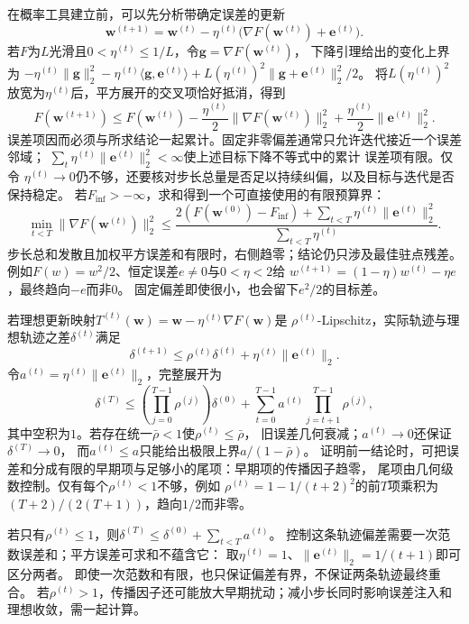在概率工具建立前，可以先分析带确定误差的更新
\[
  \bm{w}^{(t+1)}
  =\bm{w}^{(t)}-\eta^{(t)}
  \bigl(\nabla F(\bm{w}^{(t)})+\bm{e}^{(t)}\bigr).
\]
若$F$为$L$光滑且$0<\eta^{(t)}\leq1/L$，令$\bm g=\nabla F(\bm w^{(t)})$，
下降引理给出的变化上界为
$-\eta^{(t)}\|\bm g\|_2^2-\eta^{(t)}\langle\bm g,\bm e^{(t)}\rangle
+L(\eta^{(t)})^2\|\bm g+\bm e^{(t)}\|_2^2/2$。
将$L(\eta^{(t)})^2$放宽为$\eta^{(t)}$后，平方展开的交叉项恰好抵消，得到
\[
  F(\bm{w}^{(t+1)})
  \leq F(\bm{w}^{(t)})
  -\frac{\eta^{(t)}}{2}\lVert\nabla F(\bm{w}^{(t)})\rVert_2^2
  +\frac{\eta^{(t)}}{2}\lVert\bm{e}^{(t)}\rVert_2^2.
\]
误差项因而必须与所求结论一起累计。固定非零偏差通常只允许迭代接近一个误差邻域；
$\sum_t\eta^{(t)}\lVert\bm{e}^{(t)}\rVert_2^2<\infty$使上述目标下降不等式中的累计
误差项有限。仅令
$\eta^{(t)}\to0$仍不够，还要核对步长总量是否足以持续纠偏，以及目标与迭代是否保持稳定。
若$F_{\inf}>-\infty$，求和得到一个可直接使用的有限预算界：
\begin{equation}
 \min_{t<T}\|\nabla F(\bm w^{(t)})\|_2^2
 \leq\frac{2(F(\bm w^{(0)})-F_{\inf})
             +\sum_{t<T}\eta^{(t)}\|\bm e^{(t)}\|_2^2}
            {\sum_{t<T}\eta^{(t)}}.
 \label{eq:opt-inexact-gradient-finite-rate}
\end{equation}
步长总和发散且加权平方误差和有限时，右侧趋零；结论仍只涉及最佳驻点残差。
例如$F(w)=w^2/2$、恒定误差$e\neq0$与$0<\eta<2$给
$w^{(t+1)}=(1-\eta)w^{(t)}-\eta e$，最终趋向$-e$而非$0$。
固定偏差即使很小，也会留下$e^2/2$的目标差。

若理想更新映射$T^{(t)}(\bm{w})=\bm{w}-\eta^{(t)}\nabla F(\bm{w})$是
$\rho^{(t)}$-Lipschitz，实际轨迹与理想轨迹之差$\delta^{(t)}$满足
\begin{equation}
  \delta^{(t+1)}\leq\rho^{(t)}\delta^{(t)}+\eta^{(t)}\lVert\bm{e}^{(t)}\rVert_2.
  \label{eq:opt-inexact-gradient-recurrence}
\end{equation}
令$a^{(t)}=\eta^{(t)}\|\bm e^{(t)}\|_2$，完整展开为
\[
 \delta^{(T)}\leq\left(\prod_{j=0}^{T-1}\rho^{(j)}\right)\delta^{(0)}
 +\sum_{t=0}^{T-1}a^{(t)}\prod_{j=t+1}^{T-1}\rho^{(j)},
\]
其中空积为$1$。若存在统一$\bar\rho<1$使$\rho^{(t)}\leq\bar\rho$，
旧误差几何衰减；$a^{(t)}\to0$还保证$\delta^{(T)}\to0$，
而$a^{(t)}\leq a$只能给出极限上界$a/(1-\bar\rho)$。
证明前一结论时，可把误差和分成有限的早期项与足够小的尾项：早期项的传播因子趋零，
尾项由几何级数控制。仅有每个$\rho^{(t)}<1$不够，例如
$\rho^{(t)}=1-1/(t+2)^2$的前$T$项乘积为$(T+2)/(2(T+1))$，趋向$1/2$而非零。

若只有$\rho^{(t)}\leq1$，则$\delta^{(T)}\leq\delta^{(0)}+\sum_{t<T}a^{(t)}$。
控制这条轨迹偏差需要一次范数误差和；平方误差可求和不蕴含它：
取$\eta^{(t)}=1$、$\|\bm e^{(t)}\|_2=1/(t+1)$即可区分两者。
即使一次范数和有限，也只保证偏差有界，不保证两条轨迹最终重合。
若$\rho^{(t)}>1$，传播因子还可能放大早期扰动；减小步长同时影响误差注入和理想收敛，需一起计算。

